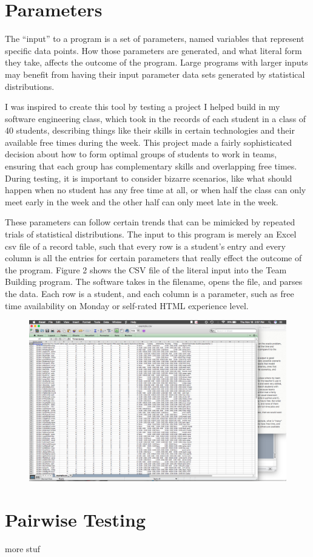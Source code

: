 \section{Parameters}
The ``input'' to a program is a set of parameters, named variables that represent specific data points. How those parameters are generated, and what literal form they take, affects the outcome of the program. Large programs with larger inputs may benefit from having their input parameter data sets generated by statistical distributions.

I was inspired to create this tool by testing a project I helped build in my software engineering class, which took in the records of each student in a class of 40 students, describing things like their skills in certain technologies and their available free times during the week. This project made a fairly sophisticated decision about how to form optimal groups of students to work in teams, ensuring that each group has complementary skills and overlapping free times. During testing, it is important to consider bizarre scenarios, like what should happen when no student has any free time at all, or when half the class can only meet early in the week and the other half can only meet late in the week.

These parameters can follow certain trends that can be mimicked by repeated trials of statistical distributions. The input to this program is merely an Excel csv file of a record table, such that every row is a student's entry and every column is all the entries for certain parameters that really effect the outcome of the program. Figure 2 shows the CSV file of the literal input into the Team Building program. The software takes in the filename, opens the file, and parses the data. Each row is a student, and each column is a parameter, such as free time availability on Monday or self-rated HTML experience level.

\begin{figure}
\includegraphics[]{team-file.png}
\end{figure}




\section{Pairwise Testing}
more stuf